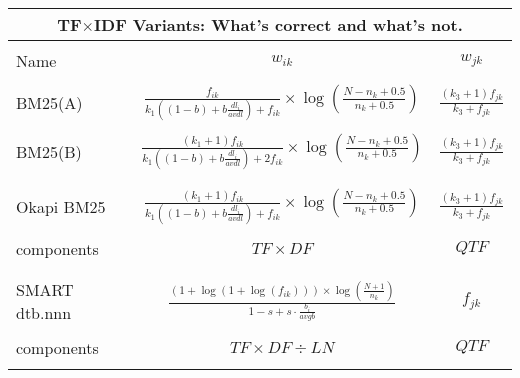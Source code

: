 \begin{table}
  \centering
  \small
  \begin{minipage}[t]{0.65\textwidth}
    
    \begin{tabular}{lcc}
      \multicolumn{3}{c}{TF$\times$IDF Variants: What's correct and what's not.}\\
      \hline\hline
      \\
      Name & $w_{ik}$ & $w_{jk}$\\
      \hline
      \\
      BM25(A)
      & $\frac{f_{ik}}{k_{1}((1-b)+b\frac{dl_{i}}{avdl})+f_{ik}} \times \log(\frac{N-n_{k}+0.5}{n_{k}+0.5})$
      & $\frac{(k_{3}+1)f_{jk}}{k_{3}+f_{jk}}$ \\
      \\
      BM25(B)
      & $\frac{(k_{1}+1)f_{ik}}{k_{1}((1-b)+b\frac{dl_{i}}{avdl})+2f_{ik}} \times \log(\frac{N-n_{k}+0.5}{n_{k}+0.5})$
      & $\frac{(k_{3}+1)f_{jk}}{k_{3}+f_{jk}}$ \\
      \\\hline
      \\
      Okapi BM25
      & $\frac{(k_{1}+1)f_{ik}}{k_{1}((1-b)+b\frac{dl_{i}}{avdl})+f_{ik}} \times \log(\frac{N-n_{k}+0.5}{n_{k}+0.5})$
      & $\frac{(k_{3}+1)f_{jk}}{k_{3}+f_{jk}}$ \\
      \\
      components & $TF \times DF$ & $QTF$ \\
      \\\hline
      \\
      SMART dtb.nnn
      & $\frac{(1+\log(1+\log(f_{ik}))) \times \log(\frac{N+1}{n_{k}})}{1-s+s \cdot \frac{b_{i}}{avgb}}$
      & $f_{jk}$ \\
      \\
      components & $TF \times DF \div LN$ & $QTF$ \\
      \\\hline\hline
      
    \end{tabular}
    

\end{minipage}
\end{table}
